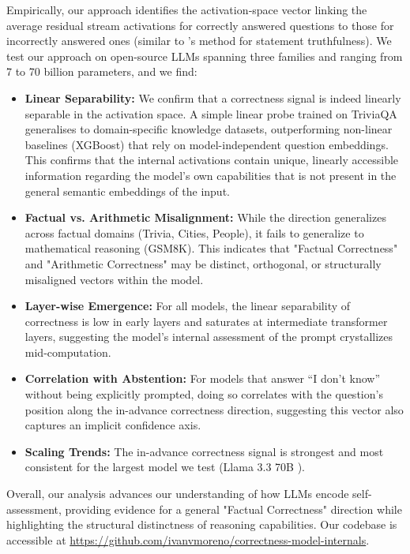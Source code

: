 \documentclass{article} %
\begin{document}
Empirically, our approach identifies the activation‐space vector linking the average residual stream activations for correctly answered questions to those for incorrectly answered ones  (similar to \citealp{burger2024truth}'s method for statement truthfulness). 
We test our approach on open-source LLMs spanning three families and ranging from 7 to 70 billion parameters, and we find:
\begin{itemize}[leftmargin=*, nosep]
\item \textbf{Linear Separability:} We confirm that a correctness signal is indeed linearly separable in the activation space. A simple linear probe trained on TriviaQA \citep{TriviaQA} generalises to domain-specific knowledge datasets, outperforming non-linear baselines (XGBoost) that rely on model-independent question embeddings. This confirms that the internal activations contain unique, linearly accessible information regarding the model's own capabilities that is not present in the general semantic embeddings of the input.
\item \textbf{Factual vs. Arithmetic Misalignment:} While the direction generalizes across factual domains (Trivia, Cities, People), it fails to generalize to mathematical reasoning (GSM8K). This indicates that "Factual Correctness" and "Arithmetic Correctness" may be distinct, orthogonal, or structurally misaligned vectors within the model.
\item \textbf{Layer-wise Emergence:} For all models, the linear separability of correctness is low in early layers and saturates at intermediate transformer layers, suggesting the model's internal assessment of the prompt crystallizes mid-computation.
\item \textbf{Correlation with Abstention:} For models that answer ``I don't know'' without being explicitly prompted, doing so correlates with the question's position along the in-advance correctness direction, suggesting this vector also captures an implicit confidence axis.
\item \textbf{Scaling Trends:} The in-advance correctness signal is strongest and most consistent for the largest model we test (Llama 3.3 70B \citep{touvron2023llama}).
\end{itemize}

Overall, our analysis advances our understanding of how LLMs encode self-assessment, providing evidence for a general "Factual Correctness" direction while highlighting the structural distinctness of reasoning capabilities. Our codebase is accessible at \url{https://github.com/ivanvmoreno/correctness-model-internals}.
\end{document}
